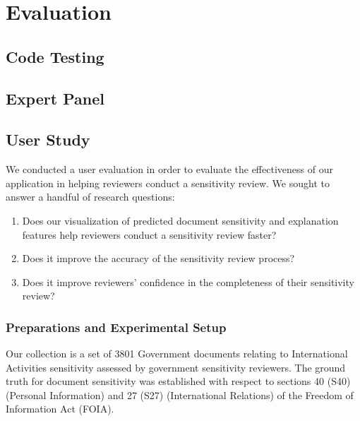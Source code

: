 \documentclass[\version]{l4proj}
\begin{document}
\chapter{Evaluation}


\section{Code Testing}

\section{Expert Panel}

\section{User Study}

We conducted a user evaluation in order to evaluate the effectiveness of our application in helping reviewers conduct a sensitivity review. We sought to answer a handful of research questions:

\begin{enumerate}[label=\textbf{RQ\arabic*}]
    \item Does our visualization of predicted document sensitivity and explanation features help reviewers conduct a sensitivity review faster?
    \item Does it improve the accuracy of the sensitivity review process?
    \item Does it improve reviewers' confidence in the completeness of their sensitivity review?
\end{enumerate}

\subsection{Preparations and Experimental Setup}

Our collection is a set of 3801 Government documents relating to International Activities sensitivity assessed by government sensitivity reviewers.
The ground truth for document sensitivity was established with respect to sections 40 (S40) (Personal Information) and 27 (S27) (International Relations) of the Freedom of Information Act (FOIA).
\end{document}
